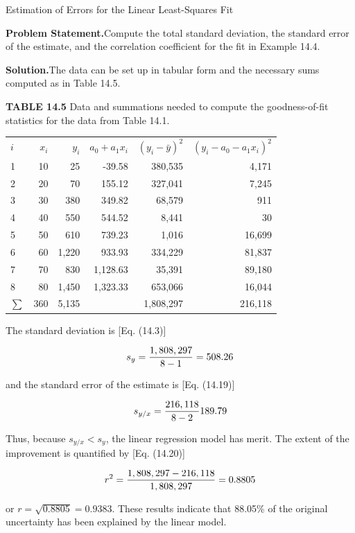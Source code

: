 \documentclass[../main.tex]{subfiles}
\begin{document}
\begin{example} Estimation of Errors for the Linear Least-Squares Fit

    \noindent\textbf{Problem Statement.}\quad Compute the total standard deviation, the standard error of the estimate, and the correlation coefficient for the fit in Example 14.4.

    \noindent\textbf{Solution.}\quad  The data can be set up in tabular form and the necessary sums computed as in Table 14.5.

    \noindent \textbf{TABLE 14.5} \quad Data and summations needed to compute the goodness-of-fit statistics
	for the data from Table 14.1.

	\begin{tabular}{lrrrrr}
		$i$ & $x_i$ & $y_i$ & $a_0 + a_1 x_i$ & $( y_i - \bar{y})^2$ & $( y_i - a_0 - a_1 x_i)^2$ \\
		1 & 10 & 25 & -39.58 & 380,535 & 4,171 \\
		2 & 20 & 70 & 155.12 & 327,041 & 7,245 \\
		3 & 30 & 380 & 349.82 & 68,579 & 911 \\
		4 & 40 & 550 & 544.52 & 8,441 & 30 \\
		5 & 50 & 610 & 739.23 & 1,016 & 16,699 \\
		6 & 60 & 1,220 & 933.93 & 334,229 & 81,837 \\
		7 & 70 & 830 & 1,128.63 & 35,391 & 89,180 \\
		8 & 80 & 1,450 & 1,323.33 & 653,066 & 16,044 \\
		$\sum$ & 360 & 5,135 & & 1,808,297 & 216,118

	\end{tabular}

    The standard deviation is [Eq. (14.3)]

	\begin{equation}
		\notag
		s_y = \frac{1,808,297}{8-1}=508.26
	\end{equation}

	\noindent and the standard error of the estimate is [Eq. (14.19)]

	\begin{equation}
		\notag
		s_{y/x} = \frac{216,118}{8-2}189.79
	\end{equation}

	\noindent Thus, because $s_{y/x} < s_y$, the linear regression model has merit. The extent of the improvement is quantified by [Eq. (14.20)]

	\begin{equation}
		\notag
		r^2 = \frac{1,808,297 - 216,118}{1,808,297} = 0.8805
	\end{equation}

	\noindent or $r = \sqrt{0.8805} = 0.9383$. These results indicate that 88.05\% of the original uncertainty has been explained by the linear model.
\end{example}
\end{document}
